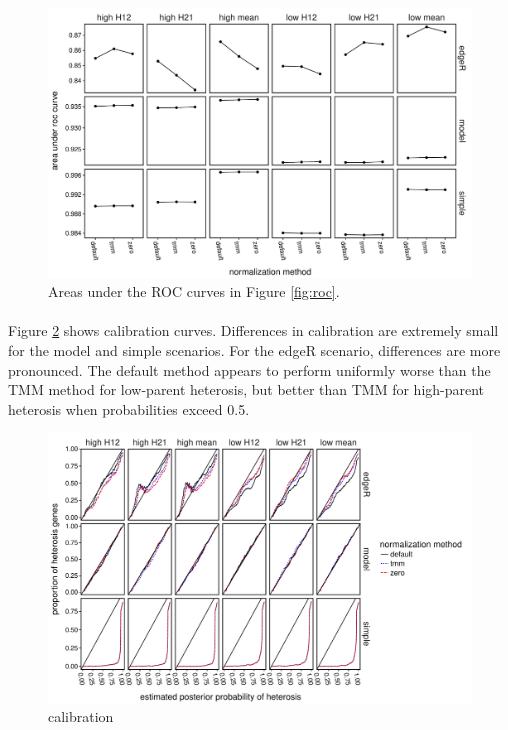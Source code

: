 \documentclass{article}
\begin{document}
\begin{flushleft}
\begin{figure}[htbp]
   \centering
   \includegraphics[scale=0.5]{auc}
   \caption{Areas under the ROC curves in Figure \ref{fig:roc}.}
   \label{fig:auc}
\end{figure}

\paragraph{} Figure \ref{fig:calibration} shows calibration curves. Differences in calibration are extremely small for the model and simple scenarios. For the edgeR scenario, differences are more pronounced. The default method appears to perform uniformly worse than the TMM method for low-parent heterosis, but better than TMM for high-parent heterosis when probabilities exceed 0.5. 

\begin{figure}[htbp]
   \centering
   \includegraphics[scale=0.5]{calibration}
   \caption{calibration}
   \label{fig:calibration}
\end{figure}


\end{flushleft}
\end{document}
